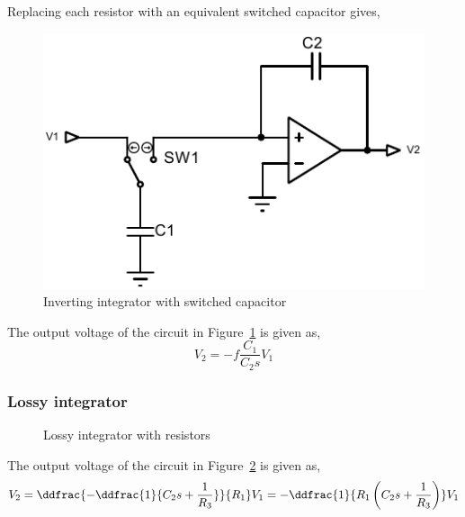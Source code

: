 Replacing each resistor with an equivalent switched capacitor gives,
\begin{figure}[H]
    \centering
    \includegraphics{../Figures/integrator}
    \caption{Inverting integrator with switched capacitor}
    \label{fig:int-cap}
\end{figure}
The output voltage of the circuit in Figure~\ref{fig:int-cap} is given as,
\begin{equation}
    V_2=-f\frac{C_1}{C_2s}V_1
\end{equation}

\subsubsection*{Lossy integrator}
\begin{figure}[H]
    \centering
    \figlossyintegrator
    \caption{Lossy integrator with resistors}
    \label{fig:int-lossy}
\end{figure}
The output voltage of the circuit in Figure~\ref{fig:int-lossy} is given as,
\begin{equation}
    V_2=\ddfrac{-\ddfrac{1}{C_2s+\frac{1}{R_3}}}{R_1}V_1=-\ddfrac{1}{R_1\left(C_2s+\frac{1}{R_3}\right)}V_1
\end{equation}

